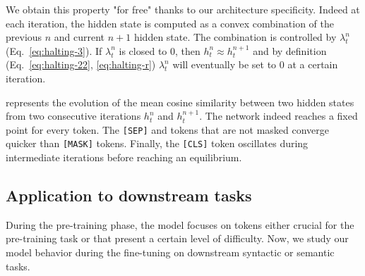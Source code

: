 We obtain this property "for free" thanks to our architecture specificity. Indeed at each iteration, the hidden state is computed as a convex combination of the previous $n$ and current $n+1$ hidden state. The combination is controlled by $\lambda^n_t$  (Eq.~\ref{eq:halting-3}). If $\lambda^n_t$ is closed to $0$, then $h^n_t \approx h^{n+1}_t$ and by definition (Eq.~\ref{eq:halting-22}, \ref{eq:halting-r}) $\lambda^n_t$ will eventually be set to $0$ at a certain iteration.




 represents the evolution of the mean cosine similarity between two hidden states from two consecutive iterations $h^n_t$ and $h^{n+1}_t$. The network indeed reaches a fixed point for every token. The \texttt{[SEP]} and tokens that are not masked converge quicker than \texttt{[MASK]} tokens. Finally, the \texttt{[CLS]} token oscillates during intermediate iterations before reaching an equilibrium.

\subsection{Application to downstream tasks}

During the pre-training phase, the model focuses on tokens either crucial for the pre-training task or that present a certain level of difficulty. Now, we study our model behavior during the fine-tuning on downstream syntactic or semantic tasks.


